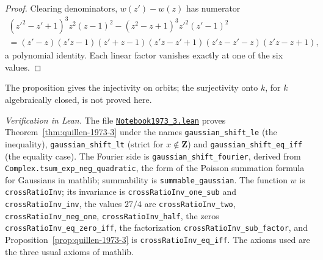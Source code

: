 \begin{proof}
Clearing denominators, $w(z') - w(z)$ has numerator
\begin{multline*}
(z'^2 - z' + 1)^3 z^2 (z-1)^2 - (z^2 - z + 1)^3 z'^2 (z'-1)^2 \\
= (z' - z)(z'z - 1)(z' + z - 1)(z'z - z' + 1)(z'z - z' - z)(z'z - z + 1),
\end{multline*}
a polynomial identity. Each linear factor vanishes exactly at one of the six values.
\end{proof}

\noindent The proposition gives the injectivity on orbits; the surjectivity onto $k$, for $k$ algebraically closed, is not proved here.

\emph{Verification in Lean.} The file \href{\leanblobmain/Notebook1973_3.lean}{\texttt{Notebook1973\_3.\allowbreak{}lean}} proves Theorem~\ref{thm:quillen-1973-3} under the names \texttt{gaussian\_shift\_le} (the inequality), \texttt{gaussian\_shift\_lt} (strict for $x \notin \mathbf Z$) and \texttt{gaussian\_shift\_eq\_iff} (the equality case). The Fourier side is \texttt{gaussian\_shift\_fourier}, derived from \texttt{Complex.tsum\_exp\_neg\_quadratic}, the form of the Poisson summation formula for Gaussians in mathlib; summability is \texttt{summable\_gaussian}. The function $w$ is \texttt{crossRatioInv}; its invariance is \texttt{crossRatioInv\_one\_sub} and \texttt{crossRatioInv\_inv}, the values $27/4$ are \texttt{crossRatioInv\_two}, \texttt{crossRatioInv\_neg\_one}, \texttt{crossRatioInv\_half}, the zeros \texttt{crossRatioInv\_eq\_zero\_iff}, the factorization \texttt{crossRatioInv\_sub\_factor}, and Proposition~\ref{prop:quillen-1973-3} is \texttt{crossRatioInv\_eq\_iff}. The axioms used are the three usual axioms of mathlib.

